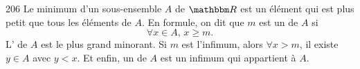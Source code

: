 

\begin{corrige}{206}
Le minimum d'un sous-ensemble $A$ de $\eR$ est un élément qui est plus petit que tous les éléments de $A$. En formule, on dit que $m$ est un  de $A$ si 
\[ 
  \forall x\in A,\,x\geq m.
\]
L' de $A$ est le plus grand minorant. Si $m$ est l'infimum, alors $\forall x>m$, il existe $y\in A$ avec $y<x$. Et enfin, un  de $A$ est un infimum qui appartient à $A$.
\end{corrige}
